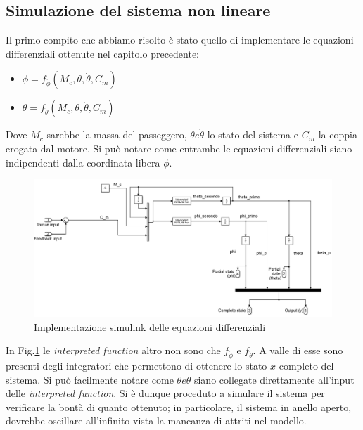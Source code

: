 \subsection{Simulazione del sistema non lineare}

Il primo compito che abbiamo risolto è stato quello di implementare le equazioni differenziali ottenute nel capitolo precedente:
\begin{itemize}
	\item $\ddot{\phi} = f_{\ddot{\phi}} (M_c,\theta,\dot{\theta},C_m)$
	\item $\ddot{\theta} = f_{\ddot{\theta}} (M_c,\theta,\dot{\theta},C_m)$
\end{itemize}

Dove $M_c$ sarebbe la massa del passeggero, $\theta e \dot{\theta}$ lo stato del sistema e $C_m$  la coppia erogata dal motore. Si può notare come entrambe le equazioni differenziali siano indipendenti dalla coordinata libera $\phi$.
\begin{figure}[H]
	\centering   	
	\includegraphics[width=1\textwidth]{Immagini/non_linear_system.png}
	\caption{Implementazione simulink delle equazioni differenziali}
	\label{fig:non_linear_system}
\end{figure}
In Fig.\ref{fig:non_linear_system} le \textit{interpreted function} altro non sono che  $f_{\ddot{\phi}}$ e $f_{\ddot{\theta}}$. A valle di esse sono presenti degli integratori che permettono di ottenere lo stato $x$ completo del sistema. Si può facilmente notare come $\dot{\theta} e \theta$ siano collegate direttamente all'input delle \textit{interpreted function}.
Si è dunque proceduto a  simulare il sistema per verificare la bontà di quanto ottenuto; in particolare, il sistema in anello aperto, dovrebbe oscillare all'infinito vista la mancanza di attriti nel modello.

